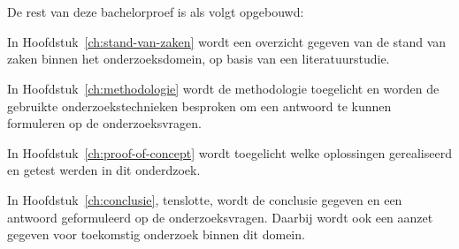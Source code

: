 \section{}%
\label{sec:opzet-bachelorproef}


De rest van deze bachelorproef is als volgt opgebouwd:

In Hoofdstuk~\ref{ch:stand-van-zaken} wordt een overzicht gegeven van de stand van zaken binnen het onderzoeksdomein, op basis van een literatuurstudie.

In Hoofdstuk~\ref{ch:methodologie} wordt de methodologie toegelicht en worden de gebruikte onderzoekstechnieken besproken om een antwoord te kunnen formuleren op de onderzoeksvragen.

In Hoofdstuk~\ref{ch:proof-of-concept} wordt toegelicht welke oplossingen gerealiseerd en getest werden in dit onderdzoek. 


In Hoofdstuk~\ref{ch:conclusie}, tenslotte, wordt de conclusie gegeven en een antwoord geformuleerd op de onderzoeksvragen. Daarbij wordt ook een aanzet gegeven voor toekomstig onderzoek binnen dit domein.